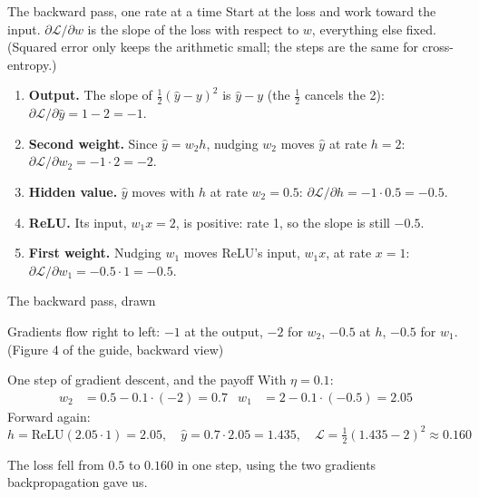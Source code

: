 \documentclass[aspectratio=169,11pt,t,\primeropts]{beamer}
\begin{document}
\begin{frame}{The backward pass, one rate at a time}
  Start at the loss and work toward the input. $\partial\mathcal{L}/\partial w$ is the slope of
  the loss with respect to $w$, everything else fixed. (Squared error only keeps the arithmetic
  small; the steps are the same for cross-entropy.)
  \vspace{2mm}
  \begin{enumerate}
    \item<1-> \textbf{Output.} The slope of $\tfrac{1}{2}(\hat{y} - y)^2$ is $\hat{y} - y$ (the
      $\tfrac{1}{2}$ cancels the 2): $\partial\mathcal{L}/\partial\hat{y} = 1 - 2 = -1$.
    \item<2-> \textbf{Second weight.} Since $\hat{y} = w_2 h$, nudging $w_2$ moves $\hat{y}$ at rate $h = 2$:
      $\partial\mathcal{L}/\partial w_2 = -1 \cdot 2 = -2$.
    \item<3-> \textbf{Hidden value.} $\hat{y}$ moves with $h$ at rate $w_2 = 0.5$:
      $\partial\mathcal{L}/\partial h = -1 \cdot 0.5 = -0.5$.
    \item<4-> \textbf{ReLU.} Its input, $w_1 x = 2$, is positive: rate 1, so the slope is still
      $-0.5$.
    \item<5-> \textbf{First weight.} Nudging $w_1$ moves ReLU's input, $w_1 x$, at rate $x = 1$:
      $\partial\mathcal{L}/\partial w_1 = -0.5 \cdot 1 = -0.5$.
  \end{enumerate}
\end{frame}

\begin{frame}{The backward pass, drawn}
  \vspace{-2mm}
  \vspace{-3mm}
  \begin{center}\small
    Gradients flow right to left: $-1$ at the output, $-2$ for $w_2$, $-0.5$ at $h$, $-0.5$ for
    $w_1$. {\color{primerMuted}(Figure 4 of the guide, backward view)}
  \end{center}
\end{frame}

\begin{frame}{One step of gradient descent, and the payoff}
  With $\eta = 0.1$:
  \begin{align*}
    w_2 &= 0.5 - 0.1 \cdot (-2) = 0.7 & w_1 &= 2 - 0.1 \cdot (-0.5) = 2.05
  \end{align*}
  \pause
  Forward again:
  \[
    h = \text{ReLU}(2.05 \cdot 1) = 2.05, \quad \hat{y} = 0.7 \cdot 2.05 = 1.435, \quad
    \mathcal{L} = \tfrac{1}{2}(1.435 - 2)^2 \approx 0.160
  \]
  \pause
  \begin{keyidea}
    The loss fell from $0.5$ to $0.160$ in one step, using the two gradients backpropagation
    gave us.
  \end{keyidea}
\end{frame}
\end{document}

